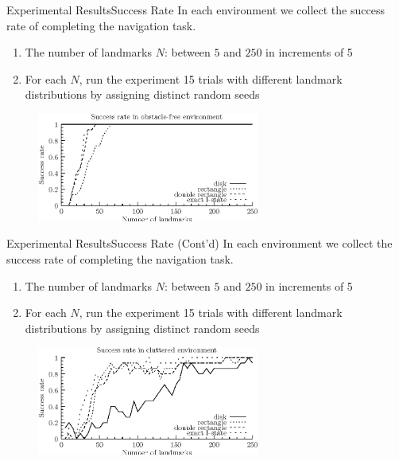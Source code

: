 \begin{frame}{Experimental Results}{Success Rate}
In each environment we collect the success rate of completing the navigation
task. 
\begin{enumerate}
\item The number of landmarks $N$: between $5$ and $250$ in increments of 5
\item For each $N$, run the experiment 15 trials with different landmark
  distributions by assigning distinct random seeds
\end{enumerate}
\begin{figure}
  \begin{center}
    \includegraphics[width=0.65\textwidth]{figs/exp_num_blank}
  \end{center}
  \label{fig:sucRate1}
\end{figure}
\end{frame}

\begin{frame}{Experimental Results}{Success Rate (Cont'd)}
In each environment we collect the success rate of completing the navigation
task. 
\begin{enumerate}
\item The number of landmarks $N$: between $5$ and $250$ in increments of 5
\item For each $N$, run the experiment 15 trials with different landmark
  distributions by assigning distinct random seeds
\end{enumerate}
\begin{figure}
  \begin{center}
    \includegraphics[width=0.65\textwidth]{figs/exp_num_clutter}
  \end{center}
  \label{fig:sucRate1}
\end{figure}
\end{frame}

